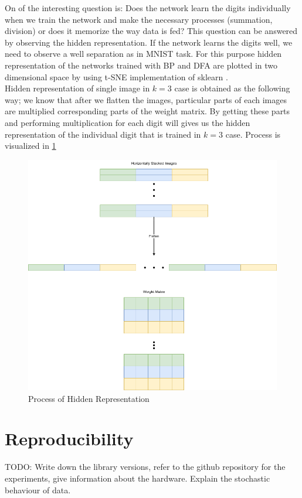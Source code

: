 \documentclass[
]{article}
\begin{document}
On of the interesting question is: Does the network learn the digits
individually when we train the network and make the necessary processes
(summation, division) or does it memorize the way data is fed? This
question can be answered by observing the hidden representation. If the
network learns the digits well, we need to observe a well separation as
in MNIST task. For this purpose hidden representation of the networks
trained with BP and DFA are plotted in two dimensional space by using
t-SNE \cite{vanDerMaaten2008} implementation of sklearn
\cite{scikit-learn}.\\
Hidden representation of single image in \(k=3\) case is obtained as the
following way; we know that after we flatten the images, particular
parts of each images are multiplied corresponding parts of the weight
matrix. By getting these parts and performing multiplication for each
digit will gives us the hidden representation of the individual digit
that is trained in \(k=3\) case. Process is visualized in
\ref{fig:HiddenRepProcess}

\begin{figure}

{\centering \includegraphics[width=1\linewidth]{../figures/hidden_rep_process} 

}

\caption{Process of Hidden Representation}\label{fig:HiddenRepProcess}
\end{figure}

\hypertarget{reproducibility}{%
\section{Reproducibility}\label{reproducibility}}

TODO: Write down the library versions, refer to the github repository
for the experiments, give information about the hardware. Explain the
stochastic behaviour of data.
\end{document}
